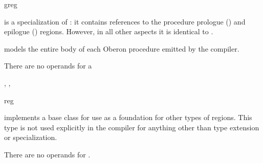 \begin{instruction}{greg}

  \begin{notes}
     is a specialization of : it contains
    references to the procedure prologue () and
    epilogue () regions.  However, in all other aspects
    it is identical to .

     models the entire body of each Oberon procedure
    emitted by the compiler.
  \end{notes}

  \nresults

  \begin{operands}
  \item There are no operands for a 
  \end{operands}

  \begin{seealso}
    , ,
  \end{seealso}
\end{instruction}

\begin{instruction}{reg}

  \begin{notes}
     implements a base class for use as a foundation for
    other types of regions.  This type is not used explicitly in the
    compiler for anything other than type extension or specialization.
  \end{notes}

  \nresults

  \begin{operands}
  \item There are no operands for .
  \end{operands}

  \begin{seealso}
  \end{seealso}
\end{instruction}

